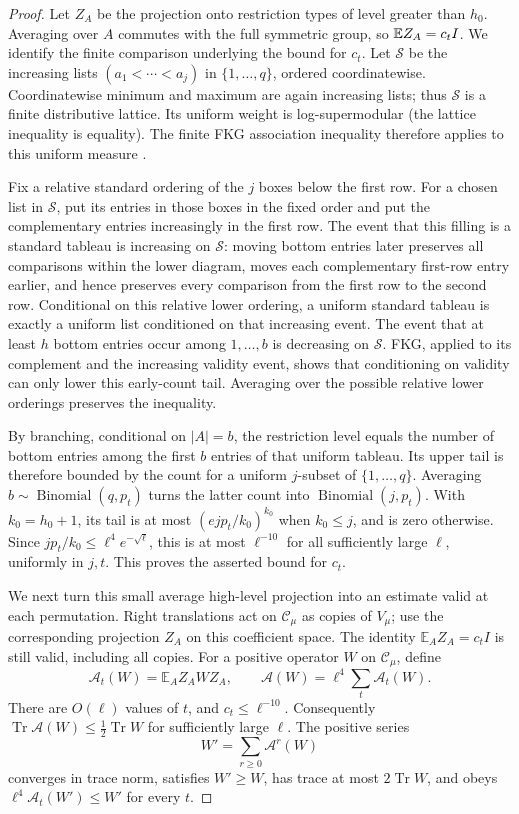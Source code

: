 \begin{proof}
Let $Z_A$ be the projection onto restriction types of level greater
than $h_0$.  Averaging over $A$ commutes with the full symmetric group,
so $\mathbb E Z_A=c_tI$.  We identify the finite comparison underlying the
bound for $c_t$.  Let $\mathcal S$ be the increasing lists
$(a_1<\cdots<a_j)$ in $\{1,\ldots,q\}$, ordered coordinatewise.
Coordinatewise minimum and maximum are again increasing lists;
thus $\mathcal S$ is a finite distributive lattice.  Its uniform
weight is log-supermodular (the lattice inequality is equality).
The finite FKG association inequality therefore applies to this
uniform measure \cite[Proposition~1]{FortuinKasteleynGinibre1971}.

Fix a relative standard ordering of the $j$ boxes below the first
row.  For a chosen list in $\mathcal S$, put its entries in those
boxes in the fixed order and put the complementary entries increasingly
in the first row.  The event that this filling is a standard tableau
is increasing on $\mathcal S$: moving bottom entries later preserves
all comparisons within the lower diagram, moves each complementary
first-row entry earlier, and hence preserves every comparison from
the first row to the second row.  Conditional on this relative lower
ordering, a uniform standard tableau is exactly a uniform list
conditioned on that increasing event.  The event that at least $h$
bottom entries occur among $1,\ldots,b$ is decreasing on $\mathcal S$.
FKG, applied to its complement and the increasing validity event,
shows that conditioning on validity can only lower this early-count
tail.  Averaging over the possible relative lower orderings preserves
the inequality.

By branching, conditional on $|A|=b$, the restriction level equals
the number of bottom entries among the first $b$ entries of that
uniform tableau.  Its upper tail is therefore bounded by the count
for a uniform $j$-subset of $\{1,\ldots,q\}$.  Averaging
$b\sim\operatorname{Binomial}(q,p_t)$ turns the latter count into
$\operatorname{Binomial}(j,p_t)$.  With $k_0=h_0+1$, its tail is at
most $(ejp_t/k_0)^{k_0}$ when $k_0\le j$, and is zero otherwise.
Since $jp_t/k_0\le\ell^4e^{-\sqrt\ell}$, this is at most
$\ell^{-10}$ for all sufficiently large $\ell$, uniformly in $j,t$.
This proves the asserted bound for $c_t$.

We next turn this small average high-level projection into an
estimate valid at each permutation. Right translations act on
$\mathcal C_\mu$ as copies of $V_\mu$; use the corresponding
projection $Z_A$ on this coefficient space. The identity
$\mathbb E_A Z_A=c_tI$ is still valid, including all copies. For a
positive operator $W$ on $\mathcal C_\mu$, define
\[
 \mathcal A_t(W)=\mathbb E_A Z_AWZ_A,
 \qquad \mathcal A(W)=\ell^4\sum_t\mathcal A_t(W).
\]
There are $O(\ell)$ values of $t$, and $c_t\le\ell^{-10}$.
Consequently $\operatorname{Tr}\mathcal A(W)\le\frac12
\operatorname{Tr}W$ for sufficiently large $\ell$. The positive
series
\[
 W'=\sum_{r\ge0}\mathcal A^r(W)
\]
converges in trace norm, satisfies $W'\ge W$, has trace at most
$2\operatorname{Tr}W$, and obeys
$\ell^4\mathcal A_t(W')\le W'$ for every $t$.


\end{proof}
